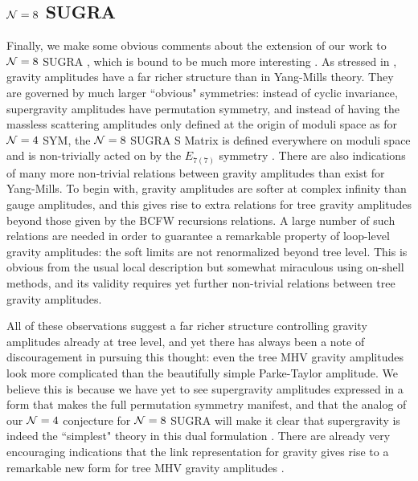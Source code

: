 \documentclass[12pt]{article}
\begin{document}
\subsection{${\cal N} = 8$ SUGRA}

Finally, we make some obvious comments about the extension of our work to ${\cal N}=8$ SUGRA \cite{Cremmer:1978ds, Cremmer:1978km, Cremmer:1979up}, which is bound to be much more interesting \cite{Bern:1998ug, Bern:1998sv, Bern:2005bb, BjerrumBohr:2005xx,
BjerrumBohr:2006yw, Bern:2006kd, Bern:2007xj, BjerrumBohr:2008vc,
BjerrumBohr:2008ji, BjerrumBohr:2008dp, Bern:2009kd, Bern:2008pv, Berkovits:2006vc, Green:2006yu, Howe:2002ui, Bern:2007hh,
 Kallosh:2007ym, Kallosh:2008mq, Kallosh:2008ru,
Bern:2009kf}.
 As stressed in \cite{simplest}, gravity amplitudes have a far richer structure than in Yang-Mills theory. They are governed by much larger ``obvious" symmetries: instead of cyclic invariance, supergravity amplitudes have permutation symmetry, and instead of having the massless scattering amplitudes only defined at the origin of moduli space as for ${\cal N} = 4$ SYM, the ${\cal N}= 8$ SUGRA S Matrix is defined everywhere on moduli space and is non-trivially acted on by the $E_{7(7)}$ symmetry \cite{simplest, Kallosh:2008rr, Kallosh:2008ic}. There are also indications of many more non-trivial relations between gravity amplitudes than exist for Yang-Mills. To begin with, gravity amplitudes are softer at complex infinity than gauge amplitudes, and this gives rise to extra relations for tree gravity amplitudes beyond those given by the BCFW recursions relations. A large number of such relations are needed in order to guarantee a remarkable property of loop-level gravity amplitudes: the soft limits are not renormalized beyond tree level. This is obvious from the usual local description but somewhat miraculous using on-shell methods, and its validity requires yet further non-trivial relations between tree gravity amplitudes.

All of these observations suggest a far richer structure controlling gravity amplitudes already at tree level, and yet there has always been a note of discouragement in pursuing this thought: even the tree MHV gravity amplitudes look more complicated than the beautifully simple Parke-Taylor amplitude. We believe this is because we have yet to see supergravity amplitudes expressed in a form that makes the full permutation symmetry manifest, and that the analog of our ${\cal N} = 4$ conjecture for ${\cal N} = 8$ SUGRA will make it clear that supergravity is indeed the ``simplest" theory in this dual formulation \cite{simplest}. There are already very encouraging indications that the link representation for gravity gives rise to a remarkable new form for tree MHV gravity amplitudes \cite{Nguyen:2009jk}.
\end{document}
